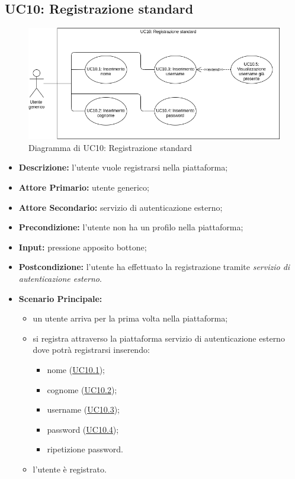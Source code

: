 \subsection{UC10: Registrazione standard}
\label{sec:UC10}
\begin{figure}[!ht]
    \caption{Diagramma di UC10: Registrazione standard}
    \vspace{10px}
    \includegraphics[scale=0.5]{../../../Images/AnalisiRequisiti/UC10}
    \centering
\end{figure}
\begin{itemize}
    \item \textbf{Descrizione:} l'utente vuole registrarsi nella piattaforma;
    \item \textbf{Attore Primario:} utente generico;
    \item \textbf{Attore Secondario:} servizio di autenticazione esterno;
    \item \textbf{Precondizione:} l'utente non ha un profilo nella piattaforma;
    \item \textbf{Input:} pressione apposito bottone;
    \item \textbf{Postcondizione:} l'utente ha effettuato la registrazione tramite \textit{servizio di autenticazione esterno}. 
    \item \textbf{Scenario Principale:}
    \begin{itemize}
        \item un utente arriva per la prima volta nella piattaforma;
        \item si registra attraverso la piattaforma servizio di autenticazione esterno dove potrà registrarsi inserendo:
        \begin{itemize}
            \item nome (\hyperref[sec:UC10.1]{\underline{UC10.1}});
            \item cognome (\hyperref[sec:UC10.2]{\underline{UC10.2}});
            \item username (\hyperref[sec:UC10.3]{\underline{UC10.3}});
            \item password (\hyperref[sec:UC10.4]{\underline{UC10.4}});
            \item ripetizione password.
        \end{itemize}
        \item l'utente è registrato.
    \end{itemize} 
\end{itemize}

